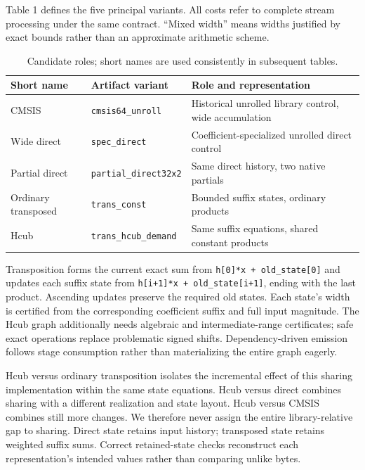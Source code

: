 \documentclass[conference]{IEEEtran}
\begin{document}
Table 1 defines the five principal variants. All costs refer to complete
stream processing under the same contract. ``Mixed width'' means widths
justified by exact bounds rather than an approximate arithmetic scheme.

\begin{table}[!t]
\centering\footnotesize
\caption{Candidate roles; short names are used consistently in subsequent tables.}\label{tab:1}
\begin{tabularx}{\textwidth}{@{}>{\raggedright\arraybackslash}X>{\raggedright\arraybackslash}X>{\raggedright\arraybackslash}X@{}}
\toprule
Short name & Artifact variant & Role and representation \\
\midrule
CMSIS & \texttt{cmsis64\_unroll} & Historical unrolled library control, wide accumulation \\
Wide direct & \texttt{spec\_direct} & Coefficient-specialized unrolled direct control \\
Partial direct & \texttt{partial\_direct32x2} & Same direct history, two native partials \\
Ordinary transposed & \texttt{trans\_const} & Bounded suffix states, ordinary products \\
Hcub & \texttt{trans\_hcub\_demand} & Same suffix equations, shared constant products \\
\bottomrule
\end{tabularx}
\end{table}

Transposition forms the current exact sum from
\texttt{h{[}0{]}*x\ +\ old\_state{[}0{]}} and updates each suffix state
from \texttt{h{[}i+1{]}*x\ +\ old\_state{[}i+1{]}}, ending with the last
product. Ascending updates preserve the required old states. Each
state's width is certified from the corresponding coefficient suffix and
full input magnitude. The Hcub graph additionally needs algebraic and
intermediate-range certificates; safe exact operations replace
problematic signed shifts. Dependency-driven emission follows stage
consumption rather than materializing the entire graph eagerly.

Hcub versus ordinary transposition isolates the incremental effect of
this sharing implementation within the same state equations. Hcub versus
direct combines sharing with a different realization and state layout.
Hcub versus CMSIS combines still more changes. We therefore never assign
the entire library-relative gap to sharing. Direct state retains input
history; transposed state retains weighted suffix sums. Correct
retained-state checks reconstruct each representation's intended values
rather than comparing unlike bytes.
\end{document}
